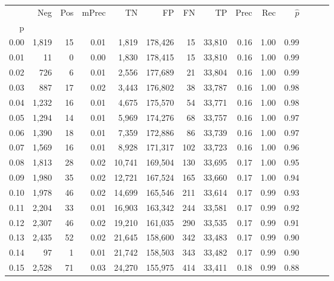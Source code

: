 \begin{tabular}{rrrrrrrrrrrrrr}
\toprule
{} &    Neg &  Pos & mPrec &       TN &       FP &      FN &      TP &  Prec &   Rec & $\hat{p}$ \\
p    &        &      &       &          &          &         &         &       &       &           \\
\midrule
0.00 &  1,819 &   15 &  0.01 &    1,819 &  178,426 &      15 &  33,810 &  0.16 &  1.00 &      0.99 \\
0.01 &     11 &    0 &  0.00 &    1,830 &  178,415 &      15 &  33,810 &  0.16 &  1.00 &      0.99 \\
0.02 &    726 &    6 &  0.01 &    2,556 &  177,689 &      21 &  33,804 &  0.16 &  1.00 &      0.99 \\
0.03 &    887 &   17 &  0.02 &    3,443 &  176,802 &      38 &  33,787 &  0.16 &  1.00 &      0.98 \\
0.04 &  1,232 &   16 &  0.01 &    4,675 &  175,570 &      54 &  33,771 &  0.16 &  1.00 &      0.98 \\
0.05 &  1,294 &   14 &  0.01 &    5,969 &  174,276 &      68 &  33,757 &  0.16 &  1.00 &      0.97 \\
0.06 &  1,390 &   18 &  0.01 &    7,359 &  172,886 &      86 &  33,739 &  0.16 &  1.00 &      0.97 \\
0.07 &  1,569 &   16 &  0.01 &    8,928 &  171,317 &     102 &  33,723 &  0.16 &  1.00 &      0.96 \\
0.08 &  1,813 &   28 &  0.02 &   10,741 &  169,504 &     130 &  33,695 &  0.17 &  1.00 &      0.95 \\
0.09 &  1,980 &   35 &  0.02 &   12,721 &  167,524 &     165 &  33,660 &  0.17 &  1.00 &      0.94 \\
0.10 &  1,978 &   46 &  0.02 &   14,699 &  165,546 &     211 &  33,614 &  0.17 &  0.99 &      0.93 \\
0.11 &  2,204 &   33 &  0.01 &   16,903 &  163,342 &     244 &  33,581 &  0.17 &  0.99 &      0.92 \\
0.12 &  2,307 &   46 &  0.02 &   19,210 &  161,035 &     290 &  33,535 &  0.17 &  0.99 &      0.91 \\
0.13 &  2,435 &   52 &  0.02 &   21,645 &  158,600 &     342 &  33,483 &  0.17 &  0.99 &      0.90 \\
0.14 &     97 &    1 &  0.01 &   21,742 &  158,503 &     343 &  33,482 &  0.17 &  0.99 &      0.90 \\
0.15 &  2,528 &   71 &  0.03 &   24,270 &  155,975 &     414 &  33,411 &  0.18 &  0.99 &      0.88 \\

\end{tabular}
